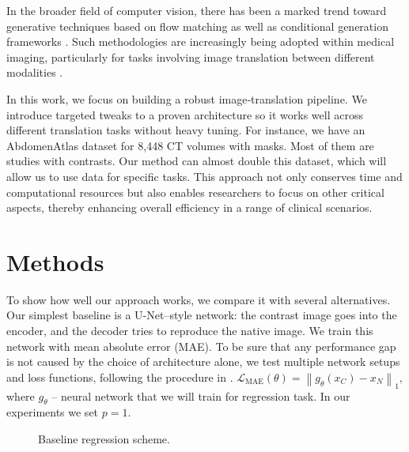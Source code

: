 \documentclass{article}
\begin{document}
In the broader field of computer vision, there has been a marked trend toward generative techniques based on flow matching \citep{albergo2022building, bilovs2021neural} as well as conditional generation frameworks \citep{lipman2022flow, tong2023improving}. Such methodologies are increasingly being adopted within medical imaging, particularly for tasks involving image translation between different modalities \citep{yazdani2025flow, reynaud2025echoflow}.

In this work, we focus on building a robust image‐translation pipeline. We introduce targeted tweaks to a proven architecture so it works well across different translation tasks without heavy tuning. 
For instance, we have an AbdomenAtlas \citep{li2024abdomenatlas} dataset for 8,448 CT volumes with masks. Most of them are studies with contrasts. Our method can almost double this dataset, which will allow us to use data for specific tasks. This approach not only conserves time and computational resources but also enables researchers to focus on other critical aspects, thereby enhancing overall efficiency in a range of clinical scenarios. 

\section{Methods}
To show how well our approach works, we compare it with several alternatives.
Our simplest baseline is a U-Net–style network: the contrast image goes into the encoder, and the decoder tries to reproduce the native image. We train this network with mean absolute error (MAE). To be sure that any performance gap is not caused by the choice of architecture alone, we test multiple network setups and loss functions, following the procedure in \citep{article_dual}.
$
    \mathcal{L}_{\text{MAE}}(\theta) = 
      \left\lVert g_{\theta}(x_C) - x_N\right\rVert_{1},
    \label{eq:baseline_loss}
$where $g_{\theta}$ -- neural network that we will train for regression task. In our experiments we set $p=1$.
\begin{figure}[h!]
  \centering
  \caption{Baseline regression scheme.}
\end{figure}
\end{document}
